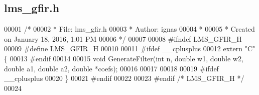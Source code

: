 \subsection{lms\+\_\+gfir.\+h}
\label{lms__gfir_8h_source}

\begin{DoxyCode}
00001 \textcolor{comment}{/* }
00002 \textcolor{comment}{ * File:   lms\_gfir.h}
00003 \textcolor{comment}{ * Author: ignas}
00004 \textcolor{comment}{ *}
00005 \textcolor{comment}{ * Created on January 18, 2016, 1:01 PM}
00006 \textcolor{comment}{ */}
00007 
00008 \textcolor{preprocessor}{#ifndef LMS\_GFIR\_H}
00009 \textcolor{preprocessor}{#define LMS\_GFIR\_H}
00010 
00011 \textcolor{preprocessor}{#ifdef  \_\_cplusplus}
00012 \textcolor{keyword}{extern} \textcolor{stringliteral}{"C"} \{
00013 \textcolor{preprocessor}{#endif}
00014 
00015 \textcolor{keywordtype}{void} GenerateFilter(\textcolor{keywordtype}{int} n, \textcolor{keywordtype}{double} w1, \textcolor{keywordtype}{double} w2, \textcolor{keywordtype}{double} a1, \textcolor{keywordtype}{double} a2, \textcolor{keywordtype}{double} *coefs);
00016 
00017 
00018 
00019 \textcolor{preprocessor}{#ifdef  \_\_cplusplus}
00020 \}
00021 \textcolor{preprocessor}{#endif}
00022 
00023 \textcolor{preprocessor}{#endif  }\textcolor{comment}{/* LMS\_GFIR\_H */}\textcolor{preprocessor}{}
00024 
\end{DoxyCode}

